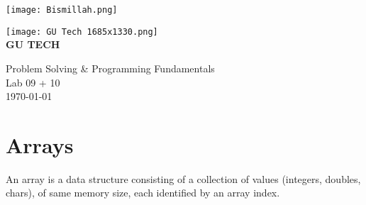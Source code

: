 \documentclass[12pt]{article}
\begin{document}
\begin{titlepage}
    \centering

    \vspace*{-8em}
    \texttt{[image: Bismillah.png]}%
    \vspace*{5em}

    
    \vspace*{1cm}

     \texttt{[image: GU Tech 1685x1330.png]}\\[2cm]

    \MakeUppercase{\Huge \textbf{GU TECH}}\\[1.5ex]
    
    \vspace*{1cm}
    
    \Huge Problem Solving \& Programming Fundamentals \\[1.5ex]
    \LARGE Lab 09 + 10 \\[2cm]


    {\Large \today}\\[1cm]
    
\end{titlepage}

\newpage



\tableofcontents

\newpage
{}
\part*{\centering Arrays}

\noindent An array is a data structure consisting of a collection of values (integers, doubles, chars), of same memory size, each identified by an array index. \\ 



\begin{table}[H]
\caption*{This array holds marks of 8 students.}
\end{table}
\end{document}
